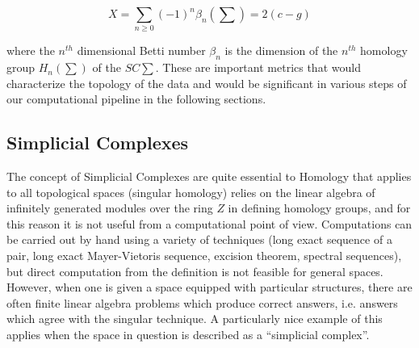 \begin{equation}
  X=\sum_{n \ge 0}(−1)^{n}\beta_{n}(\sum)=2(c - g)
\end{equation}

where the $n^{th}$ dimensional Betti number $\beta_n$ is the dimension of the $n^{th}$ homology group $H_n(\sum)$ of the $SC \sum$. These are important metrics that would characterize the topology of the data and would be significant in various steps of our computational pipeline in the following sections.\cite{01.16_EulerianGraphs} \cite{01.18_EulerFormula} \cite{17.2_TGTonlineBritanica} \cite{03.2_2008FindingHomology} \cite{08.1_2003SimplicialHomology}


\subsection{Simplicial Complexes}
The concept of Simplicial Complexes \cite{03.1_2009simplicialHomotopy} \cite{08_1971simplicialComplex} are quite essential to Homology that applies to all topological spaces (singular homology) relies on the linear algebra of infinitely generated modules over the ring $Z$ in defining homology groups, and for this reason it is not useful from a computational point of view. Computations can be carried out by hand using a variety of techniques (long exact sequence of a pair, long exact Mayer-Vietoris sequence, excision theorem, spectral sequences), but direct computation from the definition is not feasible for general spaces.\cite{03.2_2008FindingHomology}
However, when one is given a space equipped with particular structures, there are often finite linear algebra problems which produce correct answers, i.e. answers which agree with the singular technique. A particularly nice example of this applies when the space in question is described as a “simplicial complex”.\cite{08.2_1992simplicialAlgebricTopo} \cite{08.3_2018simplicialComplexes}


